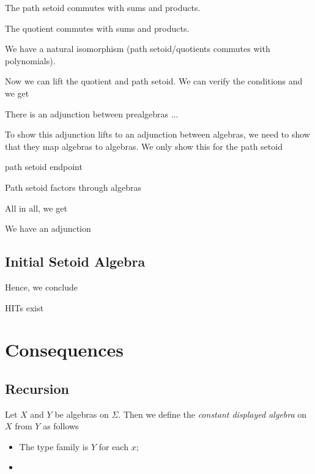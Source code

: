 \documentclass[9pt]{entcs}
\newcommand{\0}{\textbf{0}} %
\newcommand{\1}{\textbf{1}} %
\begin{document}
\begin{lemma}
The path setoid commutes with sums and products.

The quotient commutes with sums and products.
\end{lemma}

\begin{lemma}
We have a natural isomorphism (path setoid/quotients commutes with polynomials).
\end{lemma}

Now we can lift the quotient and path setoid.
We can verify the conditions and we get

\begin{lemma}
There is an adjunction between prealgebras ...
\end{lemma}

To show this adjunction lifts to an adjunction between algebras, we need to show that they map algebras to algebras.
We only show this for the path setoid

\begin{lemma}
path setoid endpoint
\end{lemma}

\begin{lemma}
Path setoid factors through algebras
\end{lemma}

All in all, we get

\begin{proposition}
We have an adjunction
\end{proposition}

\subsection{Initial Setoid Algebra}

Hence, we conclude

\begin{theorem}
HITs exist
\end{theorem}

\section{Consequences}
\label{sec:consequences}

\subsection{Recursion}

\begin{definition}
Let $X$ and $Y$ be algebras on $\Sigma$.
Then we define the \emph{constant displayed algebra} on $X$ from $Y$ as follows
\begin{itemize}
	\item The type family is $Y$ for each $x$;
	\item
\end{itemize}
\end{definition}
\end{document}
